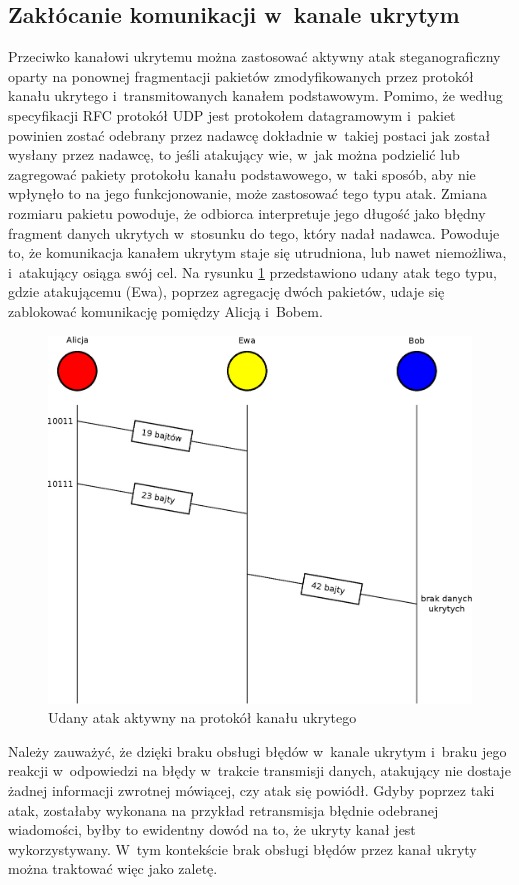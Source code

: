 \documentclass[a4paper, twoside, 12pt]{report}
\begin{document}
       \subsection{Zakłócanie komunikacji w~kanale ukrytym}
       Przeciwko kanałowi ukrytemu można zastosować aktywny atak steganograficzny
       oparty na ponownej fragmentacji pakietów zmodyfikowanych przez protokół
       kanału ukrytego i~transmitowanych kanałem podstawowym. Pomimo, że według
       specyfikacji RFC protokół UDP jest protokołem datagramowym i~pakiet powinien
       zostać odebrany przez nadawcę dokładnie w~takiej postaci jak został wysłany przez
       nadawcę, to jeśli atakujący wie, w~jak można podzielić lub zagregować
       pakiety protokołu kanału podstawowego, w~taki sposób, aby nie wpłynęło to na
       jego funkcjonowanie, może zastosować tego typu atak. Zmiana rozmiaru pakietu
       powoduje, że odbiorca interpretuje jego długość jako błędny fragment danych
       ukrytych w~stosunku do tego, który nadał nadawca. Powoduje to, że komunikacja
       kanałem ukrytym staje się utrudniona, lub nawet niemożliwa, i~atakujący osiąga
       swój cel. Na rysunku \ref{UDANYATAKAKTYWNY} przedstawiono udany atak tego typu,
       gdzie atakującemu (Ewa), poprzez agregację dwóch pakietów,
       udaje się zablokować komunikację pomiędzy Alicją i~Bobem.
        \begin{figure}[h]
                \centering
                \includegraphics[scale=0.7]{udany_atak}
                \caption{Udany atak aktywny na protokół kanału ukrytego}
                \label{UDANYATAKAKTYWNY}
        \end{figure}
       Należy zauważyć, że dzięki braku obsługi błędów w~kanale ukrytym
       i~braku jego reakcji w~odpowiedzi na błędy w~trakcie transmisji danych, atakujący
       nie dostaje żadnej informacji zwrotnej mówiącej, czy atak się powiódł. Gdyby
       poprzez taki atak, zostałaby wykonana na przykład retransmisja błędnie odebranej
       wiadomości, byłby to ewidentny dowód na to, że ukryty kanał jest wykorzystywany.
       W~tym kontekście brak obsługi błędów przez kanał ukryty można traktować więc
       jako zaletę.
\end{document}
